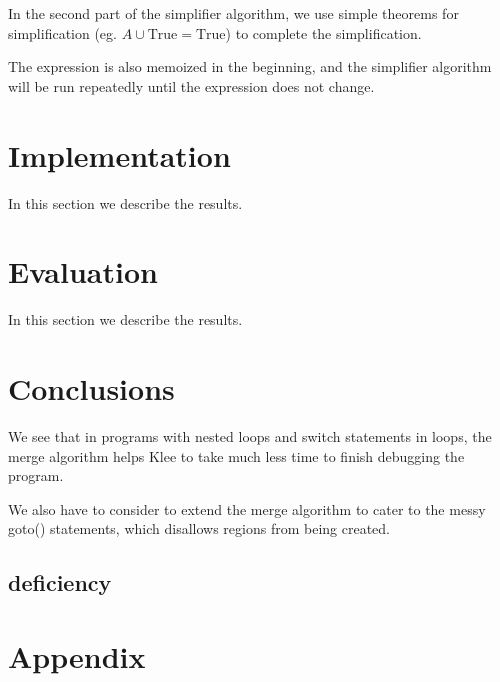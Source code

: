 \documentclass[12pt,a4paper]{article}
\begin{document}
In the second part of the simplifier algorithm, we use simple theorems for simplification (eg. $A\cup \text{True} = \text{True}$) to complete the simplification.

The expression is also memoized in the beginning, and the simplifier algorithm will be run repeatedly until the expression does not change.

\section{Implementation}\label{implementation}
In this section we describe the results.





\section{Evaluation}\label{evaluation}
In this section we describe the results.

\section{Conclusions}\label{conclusions}
We see that in programs with nested loops and switch statements in loops, the merge algorithm helps Klee to take much less time to finish debugging the program.

We also have to consider to extend the merge algorithm to cater to the messy goto() statements, which disallows regions from being created.

\subsection{deficiency}

%
%





\section{Appendix}
\end{document}
